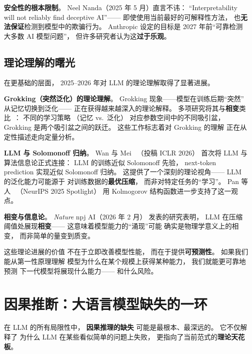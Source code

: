\textbf{安全性的根本限制}。
Neel Nanda（2025 年 5 月）直言不讳：
``Interpretability will not reliably find deceptive AI''——
即使使用当前最好的可解释性方法，
也\textbf{无法保证}检测到模型中的欺骗行为。
Anthropic 设定的目标是
2027 年前``可靠检测大多数 AI 模型问题''，
但许多研究者认为这\textbf{过于乐观}。

\subsection{理论理解的曙光}

在更基础的层面，
2025--2026 年对 LLM 的理论理解取得了显著进展。

\textbf{Grokking（突然泛化）的理论理解}。
Grokking 现象——模型在训练后期``突然''
从记忆切换到泛化——
正在获得越来越深入的理论解释。
多项研究将其与\textbf{相变}类比~\cite{cullen2026grokking}：
不同的学习策略
（记忆 vs.\ 泛化）
对应参数空间中的不同吸引盆，
Grokking 是两个吸引盆之间的跃迁。
这些工作标志着对 Grokking 的理解
正在从定性描述走向定量分析。

\textbf{LLM 与 Solomonoff 归纳}。
Wan 与 Mei~\cite{wan2025solomonoff}
（投稿 ICLR 2026）
首次将 LLM 与算法信息论正式连接：
LLM 的训练近似 Solomonoff 先验，
next-token prediction 实现近似 Solomonoff 归纳。
这提供了一个深刻的理论视角——
LLM 的泛化能力可能源于
对训练数据的\textbf{最优压缩}，
而非对特定任务的``学习''。
Pan 等人~\cite{pan2025compression}
（NeurIPS 2025 Spotlight）
用 Kolmogorov 结构函数进一步支持了这一观点。

\textbf{相变与信息论}。
\textit{Nature} npj AI（2026 年 2 月）
发表的研究表明，
LLM 在压缩阈值处展现\textbf{相变}——
这意味着模型能力的``涌现''可能
确实是物理学意义上的相变，
而非简单的量变到质变。

\begin{corebox}[理论理解的意义]
这些理论进展的价值
不在于立即改善模型性能，
而在于提供\textbf{可预测性}。
如果我们能从第一性原理理解
模型为什么在某个规模上获得某种能力，
我们就能更可靠地预测
下一代模型将展现什么能力——
和什么风险。
\end{corebox}


\section{因果推断：大语言模型缺失的一环}
\label{sec:causality}

在 LLM 的所有局限性中，
\textbf{因果推理的缺失}
可能是最根本、最深远的。
它不仅解释了
为什么 LLM 在某些看似简单的问题上失败，
更指向了当前范式的\textbf{理论天花板}。

